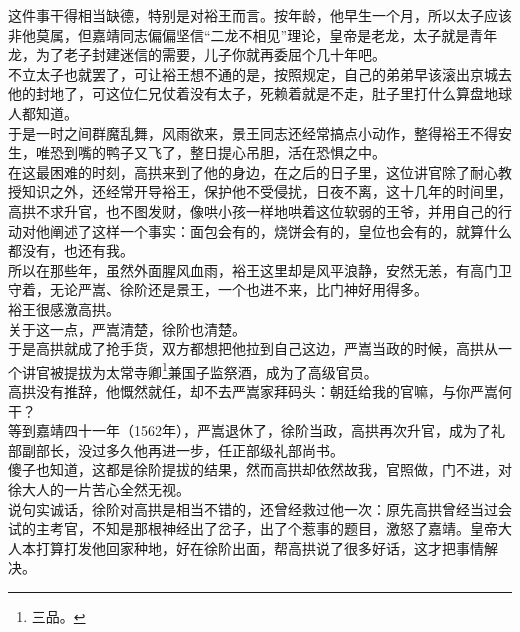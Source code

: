 \begin{multicols}{\theparacolNo}
这件事干得相当缺德，特别是对裕王而言。按年龄，他早生一个月，所以太子应该非他莫属，但嘉靖同志偏偏坚信“二龙不相见”理论，皇帝是老龙，太子就是青年龙，为了老子封建迷信的需要，儿子你就再委屈个几十年吧。\\

不立太子也就罢了，可让裕王想不通的是，按照规定，自己的弟弟早该滚出京城去他的封地了，可这位仁兄仗着没有太子，死赖着就是不走，肚子里打什么算盘地球人都知道。\\

于是一时之间群魔乱舞，风雨欲来，景王同志还经常搞点小动作，整得裕王不得安生，唯恐到嘴的鸭子又飞了，整日提心吊胆，活在恐惧之中。\\

在这最困难的时刻，高拱来到了他的身边，在之后的日子里，这位讲官除了耐心教授知识之外，还经常开导裕王，保护他不受侵扰，日夜不离，这十几年的时间里，高拱不求升官，也不图发财，像哄小孩一样地哄着这位软弱的王爷，并用自己的行动对他阐述了这样一个事实：面包会有的，烧饼会有的，皇位也会有的，就算什么都没有，也还有我。\\

所以在那些年，虽然外面腥风血雨，裕王这里却是风平浪静，安然无恙，有高门卫守着，无论严嵩、徐阶还是景王，一个也进不来，比门神好用得多。\\

裕王很感激高拱。\\

关于这一点，严嵩清楚，徐阶也清楚。\\

于是高拱就成了抢手货，双方都想把他拉到自己这边，严嵩当政的时候，高拱从一个讲官被提拔为太常寺卿\footnote{三品。}兼国子监祭酒，成为了高级官员。\\

高拱没有推辞，他慨然就任，却不去严嵩家拜码头：朝廷给我的官嘛，与你严嵩何干？\\

等到嘉靖四十一年（1562年），严嵩退休了，徐阶当政，高拱再次升官，成为了礼部副部长，没过多久他再进一步，任正部级礼部尚书。\\

傻子也知道，这都是徐阶提拔的结果，然而高拱却依然故我，官照做，门不进，对徐大人的一片苦心全然无视。\\

说句实诚话，徐阶对高拱是相当不错的，还曾经救过他一次：原先高拱曾经当过会试的主考官，不知是那根神经出了岔子，出了个惹事的题目，激怒了嘉靖。皇帝大人本打算打发他回家种地，好在徐阶出面，帮高拱说了很多好话，这才把事情解决。\\


\end{multicols}
